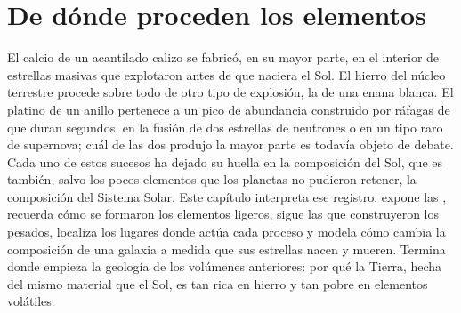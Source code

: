 \chapter{De dónde proceden los elementos}\label{ch:b3:origin-of-elements}

El calcio de un acantilado calizo se fabricó, en su mayor parte, en el interior de
estrellas masivas que explotaron antes de que naciera el Sol. El hierro del
núcleo terrestre procede sobre todo de otro tipo de explosión, la de una
enana blanca. El platino de un anillo pertenece a un pico de abundancia construido
por ráfagas de  que duran segundos, en la fusión de dos
estrellas de neutrones o en un tipo raro de supernova; cuál de las dos produjo la mayor parte es
todavía objeto de debate.
Cada uno de estos sucesos ha dejado su huella en la composición del Sol,
que es también, salvo los pocos elementos que los planetas no pudieron
retener, la composición del Sistema Solar. Este capítulo interpreta ese
registro: expone las , recuerda cómo se formaron los elementos ligeros,
sigue las  que construyeron los pesados, localiza
los lugares donde actúa cada proceso y modela cómo cambia la composición de una
galaxia a medida que sus estrellas nacen y mueren. Termina donde empieza la geología de
los volúmenes anteriores: por qué la Tierra, hecha del mismo material que
el Sol, es tan rica en hierro y tan pobre en elementos volátiles.

